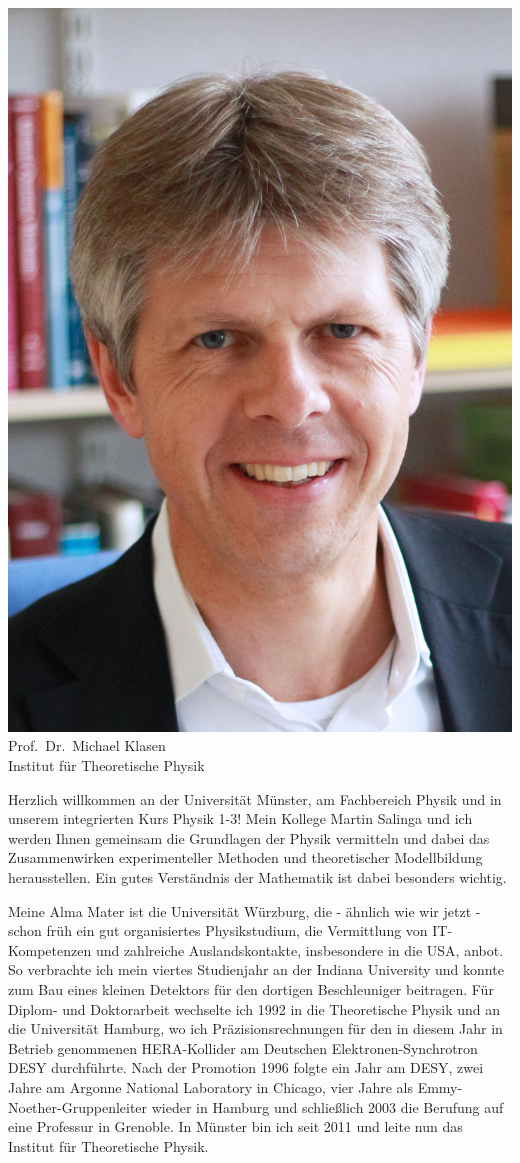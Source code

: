 \begin{multicols}{2}
\begin{center} 
\includegraphics[width=0.8\columnwidth, height=0.25\textheight]{res/vorstellungsfotos/klasen_2016_5.jpg}\\
\smallskip
Prof.\ Dr.\ Michael Klasen\\ 
Institut für Theoretische Physik
\end{center} 

Herzlich willkommen an der Universität Münster, am Fachbereich Physik und in unserem integrierten Kurs Physik 1-3! Mein Kollege Martin Salinga und ich werden Ihnen gemeinsam die Grundlagen der Physik vermitteln und dabei das Zusammenwirken experimenteller Methoden und theoretischer Modellbildung herausstellen. Ein gutes Verständnis der Mathematik ist dabei besonders wichtig. 

Meine Alma Mater ist die Universität Würzburg, die - ähnlich wie wir jetzt - schon früh ein gut organisiertes Physikstudium, die Vermittlung von IT-Kompetenzen und zahlreiche Auslandskontakte, insbesondere in die USA, anbot. So verbrachte ich mein viertes Studienjahr an der Indiana University und konnte zum Bau eines kleinen Detektors für den dortigen Beschleuniger beitragen. Für Diplom- und Doktorarbeit wechselte ich 1992 in die Theoretische Physik und an die Universität Hamburg, wo ich Präzisionsrechnungen für den in diesem Jahr in Betrieb genommenen HERA-Kollider am Deutschen Elektronen-Synchrotron DESY durchführte. Nach der Promotion 1996 folgte ein Jahr am DESY, zwei Jahre am Argonne National Laboratory in Chicago, vier Jahre als Emmy-Noether-Gruppenleiter wieder in Hamburg und schließlich 2003 die Berufung auf eine Professur in Grenoble. In Münster bin ich seit 2011 und leite nun das Institut für Theoretische Physik. 


\end{multicols}
